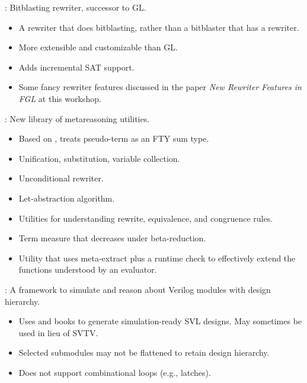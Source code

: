 \begin{frame}

\newlibtitle

:
Bitblasting rewriter, successor to GL.
\begin{itemize}
\item A rewriter that does bitblasting, rather than a bitblaster that has a rewriter.
\item More extensible and customizable than GL.
\item Adds incremental SAT support.
\item Some fancy rewriter features discussed in the paper \textit{New Rewriter Features in FGL} at this workshop.
\end{itemize}

\end{frame}


\begin{frame}

\newlibtitle

:
New library of metareasoning utilities.
\begin{itemize}
\item Based on , treats pseudo-term as an FTY sum type.
\item Unification, substitution, variable collection.
\item Unconditional rewriter.
\item Let-abstraction algorithm.
\item Utilities for understanding rewrite, equivalence, and congruence rules.
\item Term measure that decreases under beta-reduction.
\item Utility that uses meta-extract plus a runtime check to
  effectively extend the functions understood by an evaluator.
\end{itemize}

\end{frame}


\begin{frame}

\newlibtitle

:
A framework to simulate and reason about Verilog modules with design hierarchy.
\begin{itemize}
\item Uses  and  books to generate
  simulation-ready SVL designs. May sometimes be used in lieu of SVTV.
\item Selected submodules may not be flattened to retain design hierarchy.
\item Does not support combinational loops (e.g., latches).
\end{itemize}

\end{frame}

